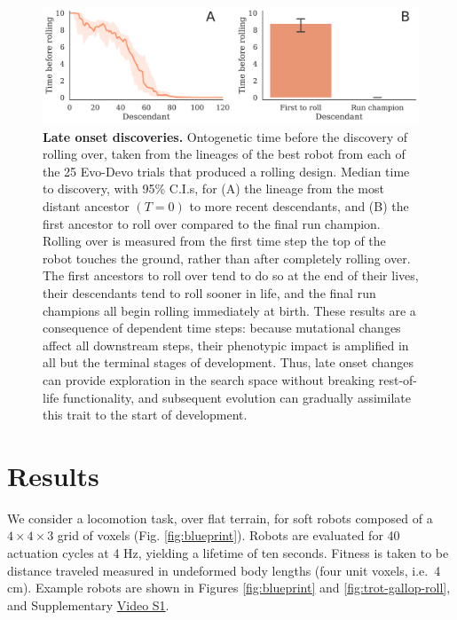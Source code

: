 \begin{figure}[t]
\centering
\includegraphics[width=0.9\linewidth]{Chapter04/Fig6}
\caption{\label{fig-discovery}\textbf{Late onset discoveries.} Ontogenetic time before the discovery of rolling over, taken from the lineages of the best robot from each of the 25 Evo-Devo trials that produced a rolling design. Median time to discovery, with 95\% C.I.s, for (A) the lineage from the most distant ancestor $(T=0)$ to more recent descendants, and (B) the first ancestor to roll over compared to the final run champion. 
Rolling over is measured from the first time step the top of the robot touches the ground, rather than after completely rolling over. 
The first ancestors to roll over tend to do so at the end of their lives, their descendants tend to roll sooner in life, and the final run champions all begin rolling immediately at birth. 
These results are a consequence of dependent time steps: 
because mutational changes affect all downstream steps, their phenotypic impact is amplified in all but the terminal stages of development. Thus, late onset changes can provide exploration in the search space without breaking rest-of-life functionality, and subsequent evolution can gradually assimilate this trait to the start of development.}
\end{figure}


\section{Results}
\label{sec:results}

We consider a locomotion task, over flat terrain, for soft robots composed of a $4\times4\times3$ grid of voxels (Fig. \ref{fig:blueprint}).
Robots are evaluated for 40 actuation cycles at 4 Hz, yielding a lifetime of ten seconds. Fitness is taken to be distance traveled measured in undeformed body lengths (four unit voxels, i.e.~4 cm). 
Example robots are shown in Figures \ref{fig:blueprint} and \ref{fig:trot-gallop-roll}, and Supplementary \href{https://youtu.be/Ee2sU-AZWC4}{Video S1}.


